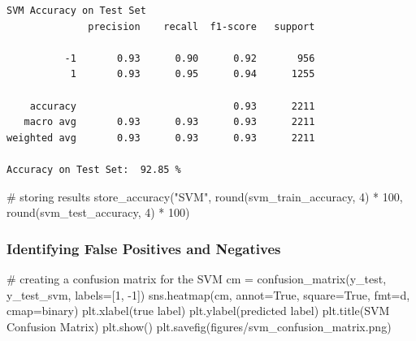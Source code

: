 \documentclass[
  letterpaper,
  DIV=11,
  numbers=noendperiod]{scrartcl}
\newenvironment{Shaded}{\begin{snugshade}}{\end{snugshade}}
\newcommand{\BuiltInTok}[1]{\textcolor[rgb]{0.00,0.23,0.31}{#1}}
\newcommand{\CommentTok}[1]{\textcolor[rgb]{0.37,0.37,0.37}{#1}}
\newcommand{\DecValTok}[1]{\textcolor[rgb]{0.68,0.00,0.00}{#1}}
\newcommand{\NormalTok}[1]{\textcolor[rgb]{0.00,0.23,0.31}{#1}}
\newcommand{\OperatorTok}[1]{\textcolor[rgb]{0.37,0.37,0.37}{#1}}
\newcommand{\StringTok}[1]{\textcolor[rgb]{0.13,0.47,0.30}{#1}}
\newcommand{\VariableTok}[1]{\textcolor[rgb]{0.07,0.07,0.07}{#1}}
\begin{document}
\begin{verbatim}
SVM Accuracy on Test Set
              precision    recall  f1-score   support

          -1       0.93      0.90      0.92       956
           1       0.93      0.95      0.94      1255

    accuracy                           0.93      2211
   macro avg       0.93      0.93      0.93      2211
weighted avg       0.93      0.93      0.93      2211

Accuracy on Test Set:  92.85 %
\end{verbatim}

\begin{Shaded}
\begin{Highlighting}[]
\CommentTok{\# storing results}
\NormalTok{store\_accuracy(}\StringTok{"SVM"}\NormalTok{, }\BuiltInTok{round}\NormalTok{(svm\_train\_accuracy, }\DecValTok{4}\NormalTok{) }\OperatorTok{*} \DecValTok{100}\NormalTok{, }\BuiltInTok{round}\NormalTok{(svm\_test\_accuracy, }\DecValTok{4}\NormalTok{) }\OperatorTok{*} \DecValTok{100}\NormalTok{)}
\end{Highlighting}
\end{Shaded}

\hypertarget{identifying-false-positives-and-negatives}{%
\subsubsection{Identifying False Positives and
Negatives}\label{identifying-false-positives-and-negatives}}

\begin{Shaded}
\begin{Highlighting}[]
\CommentTok{\# creating a confusion matrix for the SVM}
\NormalTok{cm }\OperatorTok{=}\NormalTok{ confusion\_matrix(y\_test, y\_test\_svm, labels}\OperatorTok{=}\NormalTok{[}\DecValTok{1}\NormalTok{, }\OperatorTok{{-}}\DecValTok{1}\NormalTok{])}
\NormalTok{sns.heatmap(cm, annot}\OperatorTok{=}\VariableTok{True}\NormalTok{, square}\OperatorTok{=}\VariableTok{True}\NormalTok{, fmt}\OperatorTok{=}\StringTok{\textquotesingle{}d\textquotesingle{}}\NormalTok{, cmap}\OperatorTok{=}\StringTok{\textquotesingle{}binary\textquotesingle{}}\NormalTok{)}
\NormalTok{plt.xlabel(}\StringTok{\textquotesingle{}true label\textquotesingle{}}\NormalTok{)}
\NormalTok{plt.ylabel(}\StringTok{\textquotesingle{}predicted label\textquotesingle{}}\NormalTok{)}
\NormalTok{plt.title(}\StringTok{\textquotesingle{}SVM Confusion Matrix\textquotesingle{}}\NormalTok{)}
\NormalTok{plt.show()}
\NormalTok{plt.savefig(}\StringTok{\textquotesingle{}figures/svm\_confusion\_matrix.png\textquotesingle{}}\NormalTok{)}
\end{Highlighting}
\end{Shaded}
\end{document}
